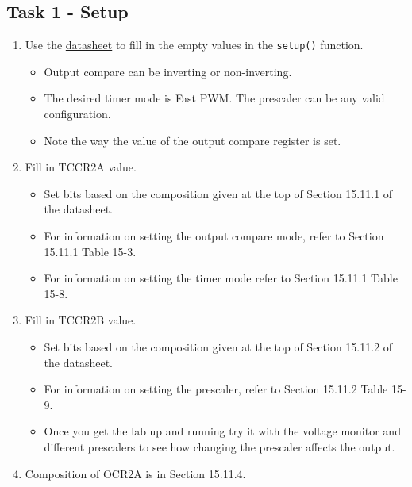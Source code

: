 \documentclass{article}
\begin{document}
    \subsection{Task 1 - Setup}
        \begin{enumerate}
            \item Use the \href{https://www.sparkfun.com/datasheets/Components/SMD/ATMega328.pdf}{datasheet} to fill in the empty values in the \texttt{setup()} function.
            \begin{itemize}
                \item Output compare can be inverting or non-inverting.
                \item The desired timer mode is Fast PWM. The prescaler can be any valid configuration.
                \item Note the way the value of the output compare register is set.
            \end{itemize}
            \item Fill in TCCR2A value.
            \begin{itemize}
                \item Set bits based on the composition given at the top of Section 15.11.1 of the datasheet.
                \item For information on setting the output compare mode, refer to Section 15.11.1 Table 15-3.
                \item For information on setting the timer mode refer to Section 15.11.1 Table 15-8.
            \end{itemize}
            \item Fill in TCCR2B value.
            \begin{itemize}
                \item Set  bits based on the composition given at the top of Section 15.11.2 of the datasheet.
                \item For information on setting the prescaler, refer to Section 15.11.2 Table 15-9.
                \item Once you get the lab up and running try it with the voltage monitor and different prescalers to see how changing the prescaler affects the output.
            \end{itemize}
             \item Composition of OCR2A is in Section 15.11.4.
        \end{enumerate}
\end{document}
